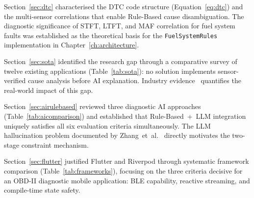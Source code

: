 Section~\ref{sec:dtc} characterised the DTC code structure (Equation~\ref{eq:dtc}) and the multi-sensor correlations that enable Rule-Based cause disambiguation.
The diagnostic significance of STFT, LTFT, and MAF correlation for fuel system faults was established as the theoretical basis for the \texttt{FuelSystemRules} implementation in Chapter~\ref{ch:architecture}.

Section~\ref{sec:sota} identified the research gap through a comparative survey of twelve existing applications (Table~\ref{tab:sota}): no solution implements sensor-verified cause analysis before AI explanation.
Industry evidence~\cite{cooke2022, bouchard2021} quantifies the real-world impact of this gap.

Section~\ref{sec:airulebased} reviewed three diagnostic AI approaches (Table~\ref{tab:aicomparison}) and established that Rule-Based~+~LLM integration uniquely satisfies all six evaluation criteria simultaneously.
The LLM hallucination problem documented by Zhang~et~al.~\cite{zhang2024gpt} directly motivates the two-stage constraint mechanism.

Section~\ref{sec:flutter} justified Flutter and Riverpod through systematic framework comparison (Table~\ref{tab:frameworks}), focusing on the three criteria decisive for an OBD-II diagnostic mobile application: BLE capability, reactive streaming, and compile-time state safety.

\clearpage
